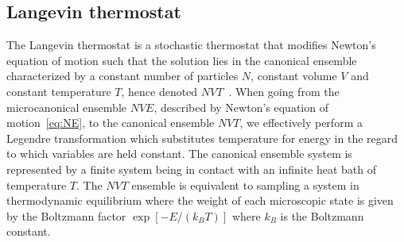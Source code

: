 \subsection{Langevin thermostat} \label{sec:langevin}




The Langevin thermostat is a stochastic thermostat that modifies Newton's
equation of motion such that the solution lies in the canonical ensemble
characterized by a constant number of particles $N$, constant volume $V$ and
constant temperature $T$, hence denoted $NVT$~\cite{Manini_2016}. When going from the microcanonical ensemble $NVE$, described by Newton's equation of motion~\cref{eq:NE}, to the canonical ensemble $NVT$, we effectively perform a Legendre transformation which substitutes temperature for energy in the regard to which variables are held constant. The canonical ensemble system is represented by a finite system being in contact with an infinite heat bath of temperature $T$. The $NVT$ ensemble is equivalent to sampling a system in thermodynamic equilibrium where the weight of each microscopic state is given by the Boltzmann factor $\exp[-E/(k_B T)]$ where $k_B$ is the Boltzmann constant. 

